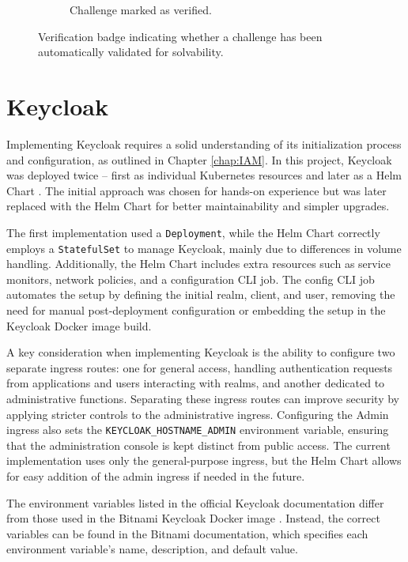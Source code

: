 \begin{figure}[h]
\begin{subfigure}[b]{0.45\textwidth}
        \caption{Challenge marked as verified.}
        \label{fig:verified_badge}
    \end{subfigure}
    \caption{Verification badge indicating whether a challenge has been automatically validated for solvability.}
    \label{fig:verification_badge}
\end{figure}

\section{Keycloak}
Implementing Keycloak requires a solid understanding of its initialization process and configuration, as outlined in Chapter \ref{chap:IAM}. In this project, Keycloak was deployed twice -- first as individual Kubernetes resources and later as a Helm Chart \cite{bitnamiKeycloakHelm}. The initial approach was chosen for hands-on experience but was later replaced with the Helm Chart for better maintainability and simpler upgrades.

The first implementation used a \texttt{Deployment}, while the Helm Chart correctly employs a \texttt{StatefulSet} to manage Keycloak, mainly due to differences in volume handling. Additionally, the Helm Chart includes extra resources such as service monitors, network policies, and a configuration CLI job. The config CLI job automates the setup by defining the initial realm, client, and user, removing the need for manual post-deployment configuration or embedding the setup in the Keycloak Docker image build.

A key consideration when implementing Keycloak is the ability to configure two separate ingress routes: one for general access, handling authentication requests from applications and users interacting with realms, and another dedicated to administrative functions. Separating these ingress routes can improve security by applying stricter controls to the administrative ingress. Configuring the Admin ingress also sets the \texttt{KEYCLOAK\_HOSTNAME\_ADMIN} environment variable, ensuring that the administration console is kept distinct from public access. The current implementation uses only the general-purpose ingress, but the Helm Chart allows for easy addition of the admin ingress if needed in the future.

The environment variables listed in the official Keycloak documentation differ from those used in the Bitnami Keycloak Docker image \parencite{bitnamiKeycloak}. Instead, the correct variables can be found in the Bitnami documentation, which specifies each environment variable's name, description, and default value.

